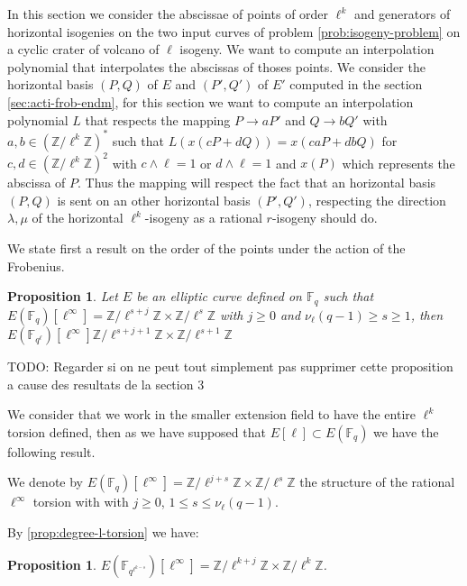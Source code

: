 \documentclass{lms}
\newcommand{\todo}[1]{{\color{red}TODO: #1}}
\newtheorem{prop}[thm]{Proposition}
\begin{document}
In this section we consider the abscissae of points of order $\ell^k$ and generators of horizontal isogenies on the two input curves of problem \ref{prob:isogeny-problem} on a cyclic crater of volcano of $\ell$ isogeny. We want to compute an interpolation polynomial that interpolates the abscissas of thoses points. We consider the horizontal basis $(P,Q)$ of $E$ and $(P',Q')$ of $E'$ computed in the section \ref{sec:acti-frob-endm}, for this section we want to compute an interpolation polynomial $L$ that respects the mapping $P \rightarrow aP'$ and $Q \rightarrow bQ'$ with $a,b \in \left(\mathbb{Z}/\ell^k \mathbb{Z} \right)^*$ such that $L(x(cP+dQ))=x(caP+dbQ)$ for $c,d \in (\mathbb{Z}/\ell^k\mathbb{Z})^2$ with $c\wedge \ell=1$ or $d \wedge \ell =1$ and $x(P)$ which represents the abscissa of $P$. Thus the mapping will respect the fact that an horizontal basis $(P,Q)$ is sent on an other horizontal basis $(P',Q')$, respecting the direction $\lambda, \mu$ of the horizontal $\ell^k$-isogeny as a rational $r$-isogeny should do.


We state first a result on the order of the points under the action of the Frobenius.

\begin{prop} %
Let $E$ be an elliptic curve defined on $\mathbb{F}_q$ such that $E(\mathbb{F}_q)[\ell^{\infty}]=\mathbb{Z}/\ell^{s+j}\mathbb{Z} \times \mathbb{Z}/\ell^{s}\mathbb{Z}$ with $ j \geqslant 0$ and $\nu_\ell(q-1) \geqslant s \geqslant 1$, then $E(\mathbb{F}_{q^{\ell}})[\ell^{\infty}]  \mathbb{Z}/\ell^{s+j+1}\mathbb{Z} \times \mathbb{Z}/\ell^{s+1}\mathbb{Z}$
\end{prop} \todo{Regarder si on ne peut tout simplement pas supprimer cette proposition a cause des resultats de la section 3}

We consider that we work in the smaller extension field to have the entire $\ell^k$ torsion defined, then as we have supposed that $E[\ell] \subset E(\mathbb{F}_q)$ we have the following result.

\begin{defi}
We denote by $E(\mathbb{F}_q)[\ell^{\infty}]=\mathbb{Z}/\ell^{j+s}
\mathbb{Z} \times \mathbb{Z}/\ell^{s} \mathbb{Z}$ the structure of the rational $\ell^{\infty}$ torsion with with $j \geqslant 0$, $1 \leqslant s \leqslant \nu_\ell(q-1)$. 
\end{defi}

By \ref{prop:degree-l-torsion} we have:
\begin{prop}
 $E(\mathbb{F}_{q^{\ell^{k-s}}})[\ell^{\infty}]=\mathbb{Z}/\ell^{k+j}
\mathbb{Z} \times \mathbb{Z}/\ell^{k} \mathbb{Z}$. 
\end{prop}
\end{document}
